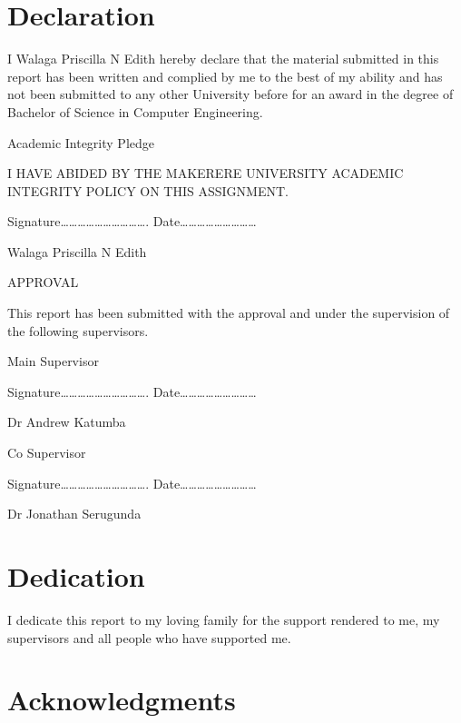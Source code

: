 \documentclass[12pt]{report}
\begin{document}
				



\section*{Declaration}

I Walaga Priscilla N Edith hereby declare that the material submitted in this  report has been written and complied by me to the best of my ability and has not been submitted to any other University before for an award in the degree of Bachelor of Science in Computer Engineering. 

Academic Integrity Pledge

I HAVE ABIDED BY THE MAKERERE UNIVERSITY ACADEMIC INTEGRITY POLICY ON THIS ASSIGNMENT.



Signature…………………………. Date……………………… 

Walaga Priscilla N Edith

APPROVAL 

This report has been submitted with the approval and under the supervision of the following supervisors.


Main Supervisor 


Signature…………………………. Date……………………… 

Dr Andrew Katumba



Co Supervisor 


Signature…………………………. Date……………………… 

Dr Jonathan Serugunda



\newpage


\section*{Dedication}


I dedicate this report to my loving family for the support rendered to me, my supervisors and all people who have supported me.




\newpage

\section*{Acknowledgments}
\end{document}
